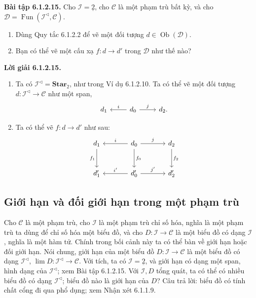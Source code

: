 \noindent\textbf{Bài tập 6.1.2.15.} Cho $\mathcal I=\underline2$, cho $\mathcal C$ là một phạm trù bất kỳ, và cho $\mathcal D=\operatorname{Fun}(\mathcal I^{\triangleleft},\mathcal C)$.
\begin{enumerate}[label=\alph*.]\item Dùng Quy tắc 6.1.2.2 để vẽ một đối tượng $d\in\operatorname{Ob}(\mathcal D)$.\item Bạn có thể vẽ một cấu xạ $f:d\to d'$ trong $\mathcal D$ như thế nào?\end{enumerate}
\noindent\textbf{Lời giải 6.1.2.15.}\keepwithnext
\begin{enumerate}[label=\alph*.]
\item Ta có $\mathcal I^{\triangleleft}=\mathbf{Star}_2$, như trong Ví dụ 6.1.2.10. Ta có thể vẽ một đối tượng $d:\mathcal I^{\triangleleft}\to\mathcal C$ như một span,
\[\begin{tikzcd}d_1&d_0\arrow[l,"i"']\arrow[r,"j"]&d_2.\end{tikzcd}\]
\item Ta có thể vẽ $f:d\to d'$ như sau:
\[\begin{tikzcd}[column sep=large,row sep=large]d_1\arrow[d,"f_1"']&d_0\arrow[l,"i"']\arrow[r,"j"]\arrow[d,"f_0"]&d_2\arrow[d,"f_2"]\\d_1'&d_0'\arrow[l,"i'"']\arrow[r,"j'"]&d_2'\end{tikzcd}\]
\end{enumerate}

\subsection{Giới hạn và đối giới hạn trong một phạm trù}
Cho $\mathcal C$ là một phạm trù, cho $\mathcal I$ là một phạm trù chỉ số hóa, nghĩa là một phạm trù ta dùng để chỉ số hóa một biểu đồ, và cho $D:\mathcal I\to\mathcal C$ là một biểu đồ có dạng $\mathcal I$,
nghĩa là một hàm tử. Chính trong bối cảnh này ta có thể bàn về giới hạn hoặc đối giới hạn. Nói chung, giới hạn của một biểu đồ $D:\mathcal I\to\mathcal C$ là một biểu đồ có dạng $\mathcal I^{\triangleleft}$, $\lim D:\mathcal I^{\triangleleft}\to\mathcal C$. Với tích, ta có $\mathcal I=\underline2$, và giới hạn có dạng một span, hình dạng của $\mathcal I^{\triangleleft}$; xem Bài tập 6.1.2.15. Với $\mathcal I,D$ tổng quát, ta có thể có nhiều biểu đồ có dạng $\mathcal I^{\triangleleft}$; biểu đồ nào là giới hạn của $D$? Câu trả lời: biểu đồ có tính chất cổng đi qua phổ dụng; xem Nhận xét 6.1.1.9.

